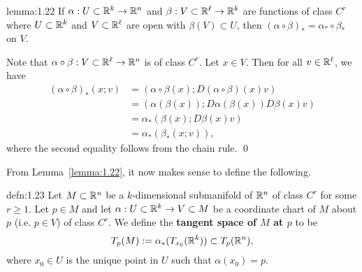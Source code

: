 \begin{lemma}{lemma:1.22}
    If $\alpha : U \subset \mathbb{R}^k \to \mathbb{R}^n$ and $\beta : V \subset \mathbb{R}^\ell 
    \to \mathbb{R}^k$ are functions of class $C^r$ where $U \subset \mathbb{R}^k$ and $V 
    \subset \mathbb{R}^\ell$ are open with $\beta(V) \subset U$, then 
    $(\alpha \circ \beta)_* = \alpha_* \circ \beta_*$ on $V$. 
\end{lemma}\vspace{-0.25cm} 
\begin{pf}
    Note that $\alpha \circ \beta : V \subset \mathbb{R}^\ell \to \mathbb{R}^n$ is 
    of class $C^r$. Let $x \in V$. Then for all $v \in \mathbb{R}^\ell$, we have 
    \begin{align*}
        (\alpha \circ \beta)_*(x; v) 
        &= (\alpha \circ \beta(x); D(\alpha \circ \beta)(x)v) \\ 
        &= (\alpha(\beta(x)); D\alpha(\beta(x))D\beta(x)v) \\ 
        &= \alpha_*(\beta(x); D\beta(x)v) \\ 
        &= \alpha_*(\beta_*(x; v)), 
    \end{align*} 
    where the second equality follows from the chain rule. \qed 
\end{pf}\vspace{-0.25cm}

From Lemma~\ref{lemma:1.22}, it now makes sense to define the following. 

\begin{defn}{defn:1.23}
    Let $M \subset \mathbb{R}^n$ be a $k$-dimensional submanifold of $\mathbb{R}^n$ 
    of class $C^r$ for some $r \geq 1$. Let $p \in M$ and let $\alpha : 
    U \subset \mathbb{R}^k \to V \subset M$ be a coordinate chart of $M$ 
    about $p$ (i.e. $p \in V$) of class $C^r$. We define the 
    {\bf tangent space of $M$ at $p$} to be 
    \[ T_p(M) := \alpha_*(T_{x_0}(\mathbb{R}^k)) \subset T_p(\mathbb{R}^n), \] 
    where $x_0 \in U$ is the unique point in $U$ such that $\alpha(x_0) = p$.  
\end{defn}\vspace{-0.25cm}